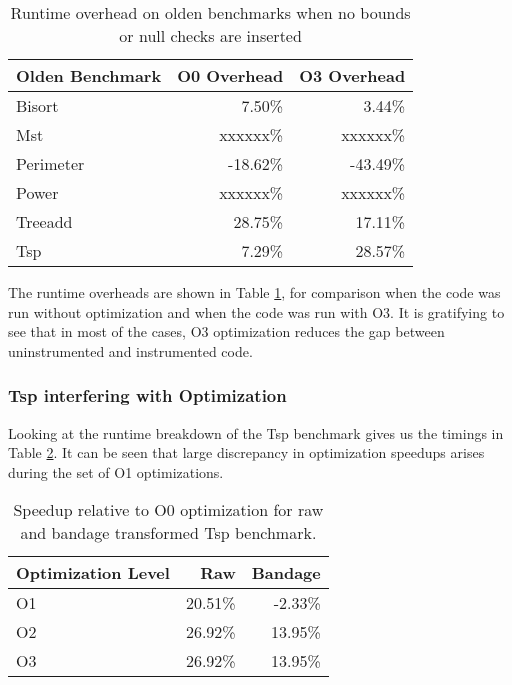 \begin{table}
\centering
\begin{tabular}{|l|r|r|}
\hline \textbf{Olden Benchmark} & \textbf{O0 Overhead} & \textbf{O3 Overhead}\\
\hline Bisort       &   7.50\%   &   3.44\% \\
\hline Mst          & xxxxxx\%   & xxxxxx\% \\
\hline Perimeter    & -18.62\%   & -43.49\% \\
\hline Power        & xxxxxx\%   & xxxxxx\% \\
\hline Treeadd      &  28.75\%   &  17.11\% \\
\hline Tsp          &   7.29\%   &  28.57\% \\
\hline
\end{tabular}
\caption{Runtime overhead on olden benchmarks when no bounds or null checks are inserted}
\label{tab:NoChecks}
\end{table}

The runtime overheads are shown in Table \ref{tab:NoChecks}, for comparison when the code was run without optimization and when the code was run with O3.
It is gratifying to see that in most of the cases, O3 optimization reduces the gap between uninstrumented and instrumented code.

\subsubsection{Tsp interfering with Optimization}

Looking at the runtime breakdown of the Tsp benchmark gives us the timings in Table \ref{tab:TspNoChecks}.
It can be seen that large discrepancy in optimization speedups arises during the set of O1 optimizations.

\begin{table}
\centering
\begin{tabular}{|l|r|r|}
\hline  \textbf{Optimization Level}  &   \textbf{Raw} &   \textbf{Bandage} \\
\hline  O1  &   20.51\%  &   -2.33\%  \\
\hline  O2  &   26.92\%  &   13.95\%  \\
\hline  O3  &   26.92\%  &   13.95\%  \\
\hline
\end{tabular}
\caption{Speedup relative to O0 optimization for raw and bandage transformed Tsp benchmark.}
\label{tab:TspNoChecks}
\end{table}


